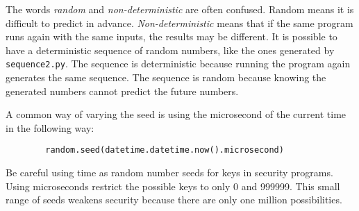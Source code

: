 \resetlinenumber[1]
\linenumbers
\begin{tt}
  
\end{tt}
\nolinenumbers


The words {\it random} and {\it non-deterministic} are often confused.
Random means it is difficult to predict in advance.  {\it
  Non-deterministic} means that if the same program runs again with
the same inputs, the results may be different.  It is possible to have
a deterministic sequence of random numbers, like the ones generated by
{\tt sequence2.py}.  The sequence is deterministic because running the
program again generates the same sequence. The sequence is random
because knowing the generated numbers cannot predict the future
numbers.



A common way of varying the seed is using the microsecond of the
current time in the following way:

\begin{verbatim}
        random.seed(datetime.datetime.now().microsecond)
\end{verbatim}

Be careful using time as random number seeds for keys in security
programs.  Using microseconds restrict the possible keys to only 0 and
999999.  This small range of seeds weakens security because there are
only one million possibilities.

